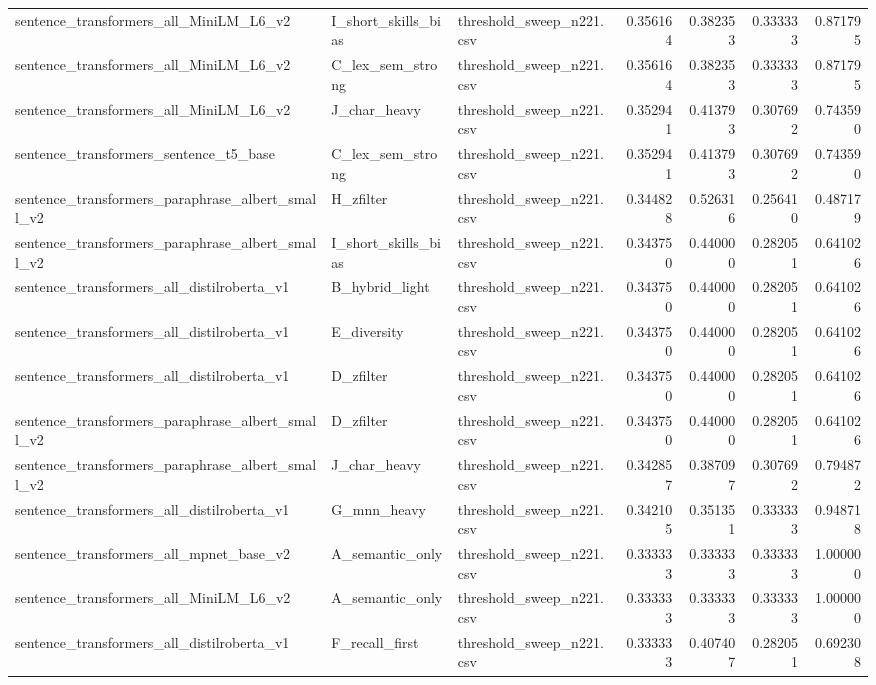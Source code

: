 \begin{table}[!ht]
\begin{tabular}{lllrrrr}
sentence\_transformers\_all\_MiniLM\_L6\_v2 & I\_short\_skills\_bias & threshold\_sweep\_n221.csv & 0.356164 & 0.382353 & 0.333333 & 0.871795 \\
sentence\_transformers\_all\_MiniLM\_L6\_v2 & C\_lex\_sem\_strong & threshold\_sweep\_n221.csv & 0.356164 & 0.382353 & 0.333333 & 0.871795 \\
sentence\_transformers\_all\_MiniLM\_L6\_v2 & J\_char\_heavy & threshold\_sweep\_n221.csv & 0.352941 & 0.413793 & 0.307692 & 0.743590 \\
sentence\_transformers\_sentence\_t5\_base & C\_lex\_sem\_strong & threshold\_sweep\_n221.csv & 0.352941 & 0.413793 & 0.307692 & 0.743590 \\
sentence\_transformers\_paraphrase\_albert\_small\_v2 & H\_zfilter & threshold\_sweep\_n221.csv & 0.344828 & 0.526316 & 0.256410 & 0.487179 \\
sentence\_transformers\_paraphrase\_albert\_small\_v2 & I\_short\_skills\_bias & threshold\_sweep\_n221.csv & 0.343750 & 0.440000 & 0.282051 & 0.641026 \\
sentence\_transformers\_all\_distilroberta\_v1 & B\_hybrid\_light & threshold\_sweep\_n221.csv & 0.343750 & 0.440000 & 0.282051 & 0.641026 \\
sentence\_transformers\_all\_distilroberta\_v1 & E\_diversity & threshold\_sweep\_n221.csv & 0.343750 & 0.440000 & 0.282051 & 0.641026 \\
sentence\_transformers\_all\_distilroberta\_v1 & D\_zfilter & threshold\_sweep\_n221.csv & 0.343750 & 0.440000 & 0.282051 & 0.641026 \\
sentence\_transformers\_paraphrase\_albert\_small\_v2 & D\_zfilter & threshold\_sweep\_n221.csv & 0.343750 & 0.440000 & 0.282051 & 0.641026 \\
sentence\_transformers\_paraphrase\_albert\_small\_v2 & J\_char\_heavy & threshold\_sweep\_n221.csv & 0.342857 & 0.387097 & 0.307692 & 0.794872 \\
sentence\_transformers\_all\_distilroberta\_v1 & G\_mnn\_heavy & threshold\_sweep\_n221.csv & 0.342105 & 0.351351 & 0.333333 & 0.948718 \\
sentence\_transformers\_all\_mpnet\_base\_v2 & A\_semantic\_only & threshold\_sweep\_n221.csv & 0.333333 & 0.333333 & 0.333333 & 1.000000 \\
sentence\_transformers\_all\_MiniLM\_L6\_v2 & A\_semantic\_only & threshold\_sweep\_n221.csv & 0.333333 & 0.333333 & 0.333333 & 1.000000 \\
sentence\_transformers\_all\_distilroberta\_v1 & F\_recall\_first & threshold\_sweep\_n221.csv & 0.333333 & 0.407407 & 0.282051 & 0.692308 \\

\end{tabular}
\end{table}
